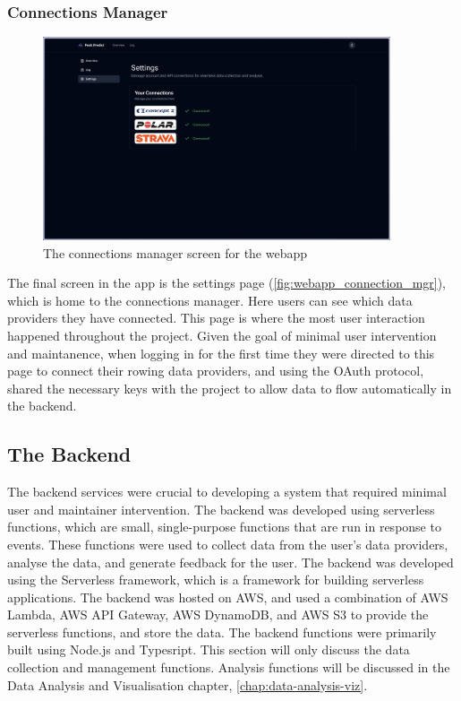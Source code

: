 \subsubsection{Connections Manager}

\begin{figure}[htbp]
  \centering
  \includegraphics[height=6cm]{figures/fyp_connections_page.jpeg}
  \captionsetup{justification=centering}
  \caption[Webapp Connections Manager]{\label{fig:webapp_connection_mgr}The connections manager screen for the webapp} 
\end{figure}
The final screen in the app is the settings page (\autoref{fig:webapp_connection_mgr}), which is home to the connections manager. Here users can see which data providers they have connected. This page is where the most user interaction happened throughout the project. Given the goal of minimal user intervention and maintanence, when logging in for the first time they were directed to this page to connect their rowing data providers, and using the OAuth protocol, shared the necessary keys with the project to allow data to flow automatically in the backend.  

\subsection{The Backend}
The backend services were crucial to developing a system that required minimal user and maintainer intervention. The backend was developed using serverless functions, which are small, single-purpose functions that are run in response to events. These functions were used to collect data from the user's data providers, analyse the data, and generate feedback for the user. The backend was developed using the Serverless framework, which is a framework for building serverless applications. The backend was hosted on AWS, and used a combination of AWS Lambda, AWS API Gateway, AWS DynamoDB, and AWS S3 to provide the serverless functions, and store the data. The backend functions were primarily built using Node.js and Typesript. This section will only discuss the data collection and management functions. Analysis functions will be discussed in the Data Analysis and Visualisation chapter, \autoref{chap:data-analysis-viz}.

